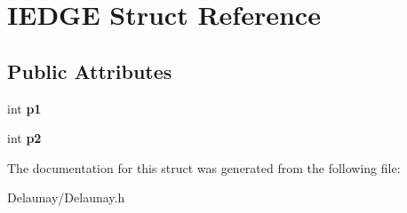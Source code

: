 \hypertarget{struct_i_e_d_g_e}{}\section{I\+E\+D\+GE Struct Reference}
\label{struct_i_e_d_g_e}
\subsection*{Public Attributes}
\begin{DoxyCompactItemize}
\item 
\mbox{\label{struct_i_e_d_g_e_a38d2facfa290c17f417fb8c8375455e3}} 
int {\bfseries p1}
\item 
\mbox{\label{struct_i_e_d_g_e_a78aa0fc06147e253ae572ce7efc5be5a}} 
int {\bfseries p2}
\end{DoxyCompactItemize}


The documentation for this struct was generated from the following file\+:\begin{DoxyCompactItemize}
\item 
Delaunay/Delaunay.\+h\end{DoxyCompactItemize}

